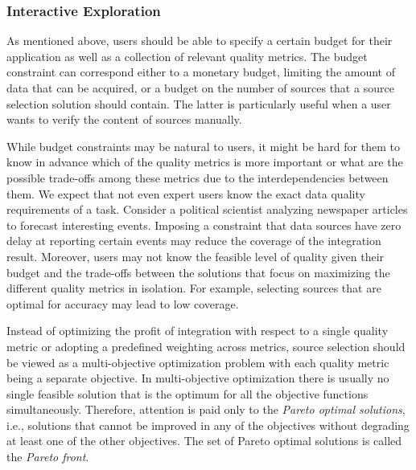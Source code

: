 \documentclass{sig-alternate}
\begin{document}
\subsubsection{Interactive Exploration}
\label{sec:eval}
As mentioned above, users should be able to specify a certain budget for their application as well as a collection of relevant quality metrics. The budget constraint can correspond either to a monetary budget, limiting the amount of data that can be acquired, or a budget on the number of sources that a source selection solution should contain. The latter is particularly useful when a user wants to verify the content of sources manually. 

While budget constraints may be natural to users, it might be hard for them to know in advance which of the quality metrics is more important or what are the possible trade-offs among these metrics due to the interdependencies between them. We expect that not even expert users know the exact data quality requirements of a task. Consider a political scientist analyzing newspaper articles to forecast interesting events. Imposing a constraint that data sources have zero delay at reporting certain events may reduce the coverage of the integration result. Moreover, users may not know the feasible level of quality given their budget and the trade-offs between the solutions that focus on maximizing the different quality metrics in isolation. For example, selecting sources that are optimal for accuracy may lead to low coverage.  

Instead of optimizing the profit of integration with respect to a single quality metric or adopting a predefined weighting across metrics, source selection should be viewed as a multi-objective optimization problem with each quality metric being a separate objective. In multi-objective optimization there is usually no single feasible solution that is the optimum for all the objective functions simultaneously. Therefore, attention is paid only to the {\em Pareto optimal solutions}, i.e., solutions that cannot be improved in any of the objectives without degrading at least one of the other objectives. The set of Pareto optimal solutions is called the {\em Pareto front}. 
\end{document}
